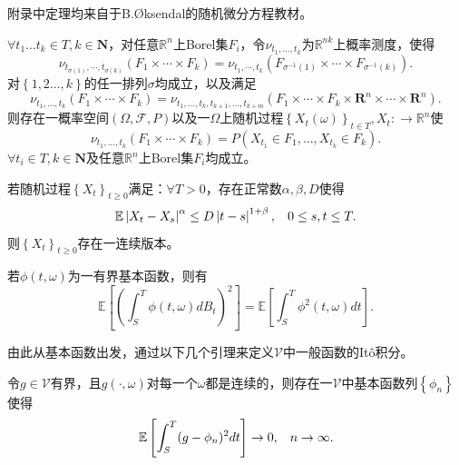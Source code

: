 \documentclass[oneside]{sysuthesis}
\begin{document}
\appendix

\chapter{}\label{A}

附录\label{A}中定理均来自于B.\O ksendal的随机微分方程教材\cite{SDE_book_BO}。

\begin{theorem}[Kolmogorov扩张定理]\label{theo:Kol_expan}
	$\forall t_1\ldots t_k\in T,k\in \textbf{N}$，对任意$\mathbb{R}^n$上Borel集$F_i$，令$\nu_{t_1,\ldots,t_k}$为$\mathbb{R}^{nk}$上概率测度，使得
	\[
	\nu_{t_{\sigma(1)}, \cdots, t_{\sigma(k)}}(F_1 \times \cdots \times F_k) = \nu_{t_1, \cdots, t_k}(F_{\sigma^{-1}(1)} \times \cdots \times F_{\sigma^{-1}(k)}).
	\]
	对$\left\{1,2\ldots,k\right\}$的任一排列$\sigma$均成立，以及满足
	\[
	\nu_{t_1, \dots, t_k} (F_1 \times \cdots \times F_k) = \nu_{t_1, \dots, t_k, t_{k+1}, \dots, t_{k+m}} (F_1 \times \cdots \times F_k \times \mathbf{R}^n \times \cdots \times \mathbf{R}^n).
	\]
	则存在一概率空间$(\Omega,\mathcal{F},P)$以及一$\Omega$上随机过程$\left \{ X_t(\omega)\right \}_{t\in T},X_t:\to \mathbb{R}^n$使
	\[
	\nu_{t_1, \dots, t_k} (F_1 \times \cdots \times F_k) = P(X_{t_1}\in F_1,\ldots,X_{t_k}\in F_k).
	\]
	$\forall t_i\in T,k\in \textbf{N}$及任意$\mathbb{R}^n$上Borel集$F_i$均成立。
\end{theorem}

\begin{theorem}[Kolmogorov连续性定理]\label{theo:Kol_continuity}
	若随机过程$\left \{ X_t\right \}_{t\ge 0}$满足：$\forall T>0$，存在正常数$\alpha,\beta,D$使得
	\[
	\mathbb{E}\left\vert X_t-X_s\right\vert^\alpha\le D\left\vert t-s\right\vert^{1+\beta},\hspace{0.3cm} 0\le s,t\le T.
	\]
	则$\left \{ X_t\right \}_{t\ge 0}$存在一连续版本。
\end{theorem}

\begin{theorem}\label{theo:Ito_isometry_fund}
	若$\phi(t,\omega)$为一有界基本函数，则有
	\[
	\mathbb{E}\left[ (\int_{S}^{T}\phi(t,\omega)dB_t)^2\right]=\mathbb{E}\left[ \int_{S}^{T}\phi^2(t,\omega)dt\right].
	\]
\end{theorem}

由此从基本函数出发，通过以下几个引理来定义$\mathcal{V}$中一般函数的It\^o积分。

\begin{theorem}[从基本函数到有界样本路径连续函数]\label{theo:step1_to_build}
	令$g\in\mathcal{V}$有界，且$g(\cdot,\omega)$对每一个$\omega$都是连续的，则存在一$\mathcal{V}$中基本函数列$\left\{\phi_n\right\}$使得
	\[
	\mathbb{E}\left[\int_{S}^{T}(g-\phi_n)^2dt\right]\to 0,\hspace{0.3cm}n\to\infty.
	\]
\end{theorem}
\end{document}
